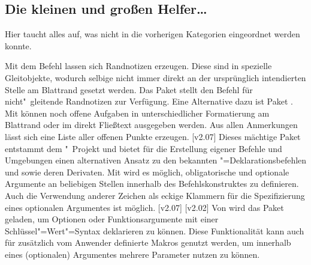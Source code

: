 \subsection{Die kleinen und großen Helfer\dots}
%
Hier taucht alles auf, was nicht in die vorherigen Kategorien eingeordnet 
werden konnte.

\begin{DeclarePackages}
  Mit dem Befehl  lassen sich Randnotizen erzeugen. Diese sind 
  in  spezielle Gleitobjekte, wodurch selbige nicht immer direkt 
  an der ursprünglich intendierten Stelle am Blattrand gesetzt werden. Das 
  Paket  stellt den Befehl  für 
  nicht"~gleitende Randnotizen zur Verfügung. Eine Alternative dazu ist Paket 
  .
  Mit  können noch offene Aufgaben in unterschiedlicher 
  Formatierung am Blattrand oder im direkt Fließtext ausgegeben werden. Aus 
  allen Anmerkungen lässt sich eine Liste aller offenen Punkte erzeugen.
  [v2.07]
  Dieses mächtige Paket entstammt dem "~Projekt und bietet für 
  die Erstellung eigener Befehle und Umgebungen einen alternativen Ansatz zu 
  den bekannten "=Deklarationsbefehlen  und 
   sowie deren Derivaten. Mit  wird es 
  möglich, obligatorische und optionale Argumente an beliebigen Stellen 
  innerhalb des Befehlskonstruktes zu definieren. Auch die Verwendung anderer 
  Zeichen als eckige Klammern für die Spezifizierung eines optionalen 
  Argumentes ist möglich.
  [v2.07]
[v2.02]
  Von  wird das Paket  geladen, um Optionen 
  oder Funktionsargumente mit einer Schlüssel"=Wert"=Syntax deklarieren zu 
  können. Diese Funktionalität kann auch für zusätzlich vom Anwender definierte 
  Makros genutzt werden, um innerhalb eines (optionalen) Argumentes mehrere 
  Parameter nutzen zu können.
  

\end{DeclarePackages}
